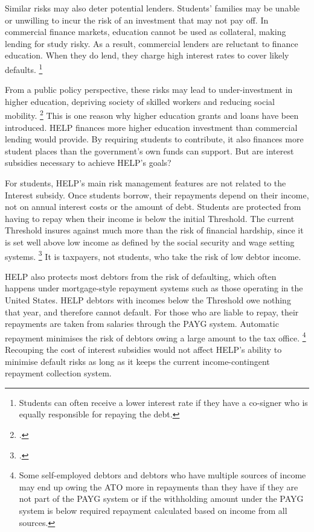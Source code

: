 \documentclass[embargoed]{grattan}
\begin{document}
Similar risks may also deter potential lenders.
Students' families may be unable or unwilling to incur the risk of an investment that may not pay off.
In commercial finance markets, education cannot be used as collateral, making lending for study risky.
As a result, commercial lenders are reluctant to finance education.
When they do lend, they charge high interest rates to cover likely defaults.%
\footnote{Students can often receive a lower interest rate if they have a co-signer who is equally responsible for repaying the debt.}

From a public policy perspective, these risks may lead to under-investment in higher education, depriving society of skilled workers and reducing social mobility.%
\footcite[][Section~2.5]{Chapman2006Governmentmanagingrisk} 
This is one reason why higher education grants and loans have been introduced.
\gls{HELP} finances more higher education investment than commercial lending would provide.
By requiring students to contribute, it also finances more student places than the government's own funds can support.
But are interest subsidies necessary to achieve \gls{HELP}'s goals?

For students, \gls{HELP}'s main risk management features are not related to the \gls{Interest subsidy}.
Once students borrow, their repayments depend on their income, not on annual interest costs or the amount of debt.
Students are protected from having to repay when their income is below the initial \gls{Threshold}.
The current \gls{Threshold} insures against much more than the risk of financial hardship, since it is set well above low income as defined by the social security and wage setting systems.%
\footcite[][Chapter~4]{Norton2016HELPfuturefairer} 
It is taxpayers, not students, who take the risk of low debtor income.

\gls{HELP} also protects most debtors from the risk of defaulting, which often happens under mortgage-style repayment systems such as those operating in the United States.
\gls{HELP} debtors with incomes below the \gls{Threshold} owe nothing that year, and therefore cannot default.
For those who are liable to repay, their repayments are taken from salaries through the \gls{PAYG} system.
Automatic repayment minimises the risk of debtors owing a large amount to the tax office.%
\footnote{Some self-employed debtors and debtors who have multiple sources of income may end up owing the \gls{ATO} more in repayments than they have if they are not part of the \gls{PAYG} system or if the withholding amount under the \gls{PAYG} system is below required repayment calculated based on income from all sources.} Recouping the cost of interest subsidies would not affect \gls{HELP}'s ability to minimise default risks as long as it keeps the current income-contingent repayment collection system.
\end{document}
